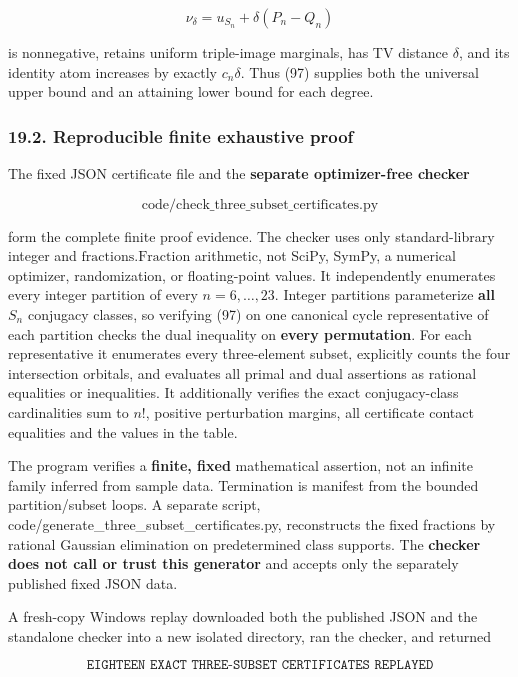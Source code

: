 \documentclass[
  11pt,
]{article}
\begin{document}
\[
\nu_\delta=u_{S_n}+\delta(P_n-Q_n)
\]

is nonnegative, retains uniform triple-image marginals, has TV distance
\(\delta\), and its identity atom increases by exactly \(c_n\delta\).
Thus (97) supplies both the universal upper bound and an attaining lower
bound for each degree.

\subsubsection{19.2. Reproducible finite exhaustive
proof}\label{reproducible-finite-exhaustive-proof}

The fixed JSON certificate file and the \textbf{separate optimizer-free
checker}

\[
\text{code/check\_three\_subset\_certificates.py} \tag{98}
\]

form the complete finite proof evidence. The checker uses only
standard-library integer and \(\mathrm{fractions.Fraction}\) arithmetic,
not SciPy, SymPy, a numerical optimizer, randomization, or
floating-point values. It independently enumerates every integer
partition of every \(n=6,\ldots,23\). Integer partitions parameterize
\textbf{all} \(S_n\) conjugacy classes, so verifying (97) on one
canonical cycle representative of each partition checks the dual
inequality on \textbf{every permutation}. For each representative it
enumerates every three-element subset, explicitly counts the four
intersection orbitals, and evaluates all primal and dual assertions as
rational equalities or inequalities. It additionally verifies the exact
conjugacy-class cardinalities sum to \(n!\), positive perturbation
margins, all certificate contact equalities and the values in the table.

The program verifies a \textbf{finite, fixed} mathematical assertion,
not an infinite family inferred from sample data. Termination is
manifest from the bounded partition/subset loops. A separate script,
code/generate\_three\_subset\_certificates.py, reconstructs the fixed
fractions by rational Gaussian elimination on predetermined class
supports. The \textbf{checker does not call or trust this generator} and
accepts only the separately published fixed JSON data.

A fresh-copy Windows replay downloaded both the published JSON and the
standalone checker into a new isolated directory, ran the checker, and
returned

\[
\texttt{EIGHTEEN EXACT THREE-SUBSET CERTIFICATES REPLAYED}
\]
\end{document}
